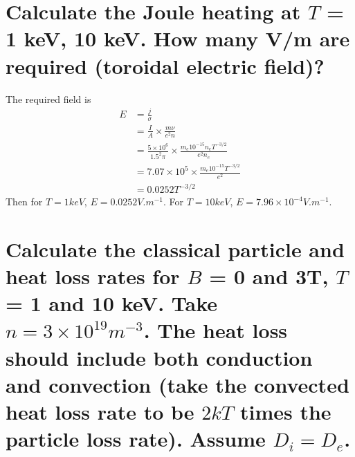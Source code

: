 \documentclass[answers]{exam}
\begin{document}
\begin{questions}

\begin{parts}

\part{Calculate the Joule heating at $T$ = 1 keV, 10 keV. How many V/m are required (toroidal electric field)?}


\begin{solution}
    The required field is
    \begin{align*}
        E &= \frac{j}{\sigma} \\
          &= \frac{I}{A} \times \frac{m\nu}{e^2n} \\
          &= \frac{5 \times 10^6}{1.5^2\pi} \times \frac{m_e10^{-15}n_eT^{-3/2}}{e^2n_e} \\
          &= 7.07 \times 10^5 \times \frac{m_e10^{-15}T^{-3/2}}{e^2} \\
          &= 0.0252T^{-3/2}
    \end{align*}
    Then for $T = 1 \unit{keV}$, $E = 0.0252 \unit{V.m^{-1}}$. For $T = 10 \unit{keV}$, $E = 7.96 \times 10^{-4} \unit{V.m^{-1}}$.
\end{solution}

\part{Calculate the classical particle and heat loss rates for $B$ = 0 and 3T, $T$ = 1 and 10 keV. Take $n = 3 \times 10^{19} \unit{m^{-3}}$. The heat loss should include both conduction and convection (take the convected heat loss rate to be $2kT$ times the particle loss rate). Assume $D_i = D_e$.}



\end{parts}
\end{questions}
\end{document}
